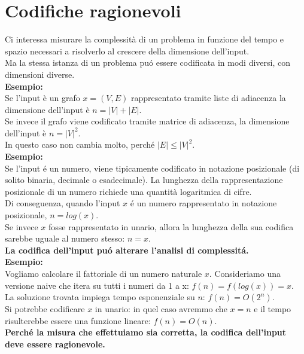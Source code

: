 \section{Codifiche ragionevoli}

Ci interessa misurare la complessità di un problema in funzione del tempo e spazio necessari a risolverlo al crescere della dimensione dell'input. \\
Ma la stessa istanza di un problema puó essere codificata in modi diversi, con dimensioni diverse. \\

\textbf{Esempio:} \\
Se l'input è un grafo $x = (V, E)$ rappresentato tramite liste di adiacenza la dimensione dell'input è $n = |V| + |E|$. \\
Se invece il grafo viene codificato tramite matrice di adiacenza, la dimensione dell'input è $n = |V|^2$. \\
In questo caso non cambia molto, perché $|E| \leq |V|^2$. \\

\textbf{Esempio:} \\
Se l'input é un numero, viene tipicamente codificato in notazione posizionale (di solito binaria, decimale o esadecimale).
La lunghezza della rappresentazione posizionale di un numero richiede una quantità logaritmica di cifre. \\
Di conseguenza, quando l'input $x$ é un numero rappresentato in notazione posizionale, $n = log(x)$. \\
Se invece $x$ fosse rappresentato in unario, allora la lunghezza della sua codifica sarebbe uguale al numero stesso: $n = x$. \\

\textbf{La codifica dell'input puó alterare l'analisi di complessitá.} \\

\textbf{Esempio:} \\
Vogliamo calcolare il fattoriale di un numero naturale $x$. Consideriamo una versione naive che itera su tutti i numeri da 1 a x: $f(n) = f(log(x)) = x$. \\
La soluzione trovata impiega tempo esponenziale su $n$: $f(n) = O(2^n)$. \\
Si potrebbe codificare $x$ in unario: in quel caso avremmo che $x = n$ e il tempo risulterebbe essere una funzione lineare: $f(n) = O(n)$. \\

\textbf{Perché la misura che effettuiamo sia corretta, la codifica dell'input deve essere ragionevole.} \\
